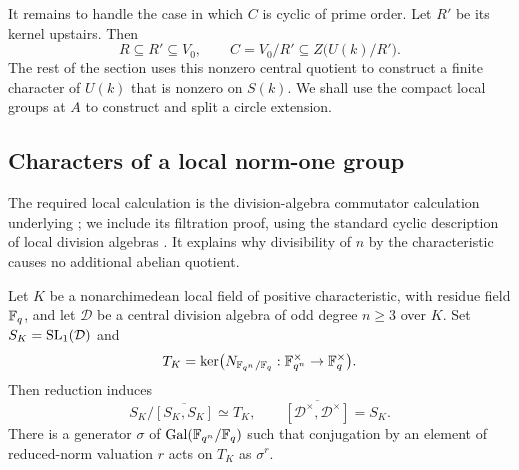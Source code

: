 It remains to handle the case in which $C$ is cyclic of prime order.
Let $R'$ be its kernel upstairs.  Then
\begin{equation}\label{quo:central-quotient}
 R\subseteq R'\subseteq V_0,
 \qquad C=V_0/R'\subseteq Z\bigl(U(k)/R'\bigr).
\end{equation}
The rest of the section uses this nonzero central quotient to construct
a finite character of $U(k)$ that is nonzero on $S(k)$.  We shall use the compact
local groups at $A$ to construct and split a circle extension.

\subsection{Characters of a local norm-one group}

The required local calculation is the division-algebra commutator
calculation underlying \cite{Riehm}; we include its filtration proof,
using the standard cyclic description of local division algebras
\cite{Reiner}.  It explains why divisibility of $n$ by the
characteristic causes no additional abelian quotient.

\begin{lemma}\label{quo:local-abelianization}
Let $K$ be a nonarchimedean local field of positive characteristic,
with residue field $\mathbb F_q$, and let $\mathcal D$ be a central division
algebra of odd degree $n\geq3$ over $K$.  Set $S_K=\operatorname{SL}_1(\mathcal D)$
and
\[
 T_K=\ker\bigl(N_{\mathbb F_{q^n}/\mathbb F_q}:
                    \mathbb F_{q^n}^{\times}\to\mathbb F_q^{\times}\bigr).
\]
Then reduction induces
\[
 S_K/\overline{[S_K,S_K]}\simeq T_K,
 \qquad
 \overline{[\mathcal D^\times,\mathcal D^\times]}=S_K.
\]
There is a generator $\sigma$ of
$\operatorname{Gal}(\mathbb F_{q^n}/\mathbb F_q)$ such that conjugation by an element of
reduced-norm valuation $r$ acts on $T_K$ as $\sigma^r$.
\end{lemma}

